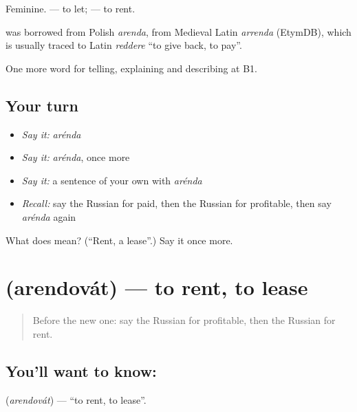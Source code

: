 Feminine. \emph{  } — to let; \emph{  } — to rent.

\begin{cousinweb}
\textbf{} was borrowed from Polish \emph{arenda}, from Medieval Latin \emph{arrenda} (EtymDB), which is usually traced to Latin \emph{reddere} \textquotedblleft{}to give back, to pay\textquotedblright{}.
\end{cousinweb}

\begin{grammarlens}[title={What you've built}]
One more word for telling, explaining and describing at B1.
\end{grammarlens}

\subsection*{Your turn}
\begin{itemize}
\raggedright
  \item \emph{Say it:} \emph{arénda}
  \item \emph{Say it:} \emph{arénda}, once more
  \item \emph{Say it:} a sentence of your own with \emph{arénda}
  \item \emph{Recall:} say the Russian for paid, then the Russian for profitable, then say \emph{arénda} again
\end{itemize}

\begin{tcolorbox}[breakable,colback=teal!4,colframe=teal!35!black,title={Before you move on}]
What does  mean? (\textquotedblleft{}Rent, a lease\textquotedblright{}.) Say it once more.
\end{tcolorbox}
\section[\texorpdfstring{\ru{арендовать} (arendovát)}{арендовать (arendovát)}]{ (arendovát) — to rent, to lease}

\label{lesson:RU-C398-arendovat}



\begin{quote}
Before the new one: say the Russian for profitable, then the Russian for rent.
\end{quote}

\subsection*{You'll want to know: }
\textbf{} (\emph{arendovát}) — \textquotedblleft{}to rent, to lease\textquotedblright{}.

